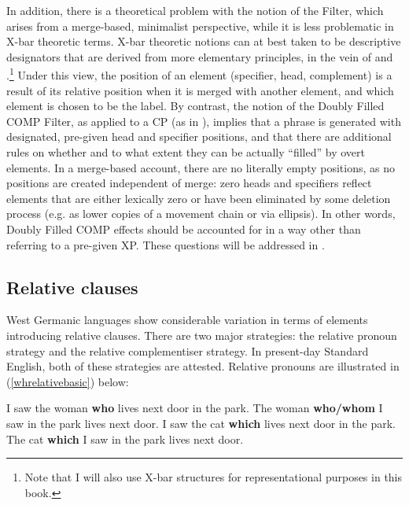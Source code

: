 In addition, there is a theoretical problem with the notion of the Filter, which arises from a merge-based, minimalist perspective, while it is less problematic in X-bar theoretic terms. X-bar theoretic notions can at best taken to be descriptive designators that are derived from more elementary principles, in the vein of \citet{kayne1994} and \citet{chomsky1995}.\footnote{Note that I will also use X-bar structures for representational purposes in this book.} Under this view, the position of an element (specifier, head, complement) is a result of its relative position when it is merged with another element, and which element is chosen to be the label. By contrast, the notion of the Doubly Filled COMP Filter, as applied to a CP (as in \citealt{baltin2010}), implies that a phrase is generated with designated, pre-given head and specifier positions, and that there are additional rules on whether and to what extent they can be actually ``filled'' by overt elements. In a merge-based account, there are no literally empty positions, as no positions are created independent of merge: zero heads and specifiers reflect elements that are either lexically zero or have been eliminated by some deletion process (e.g. as lower copies of a movement chain or via ellipsis). In other words, Doubly Filled COMP effects should be accounted for in a way other than referring to a pre-given XP. These questions will be addressed in .

\subsection{Relative clauses} \label{sec:1relative}
West Germanic languages show considerable variation in terms of elements introducing relative clauses. There are two major strategies: the relative pronoun strategy and the relative complementiser strategy. In present-day Standard English, both of these strategies are attested. Relative pronouns are illustrated in (\ref{whrelativebasic}) below:

\ea \label{whrelativebasic}
\ea I saw the woman \textbf{who} lives next door in the park. \label{whosubjectch1}
\ex The woman \textbf{who/whom} I saw in the park lives next door. \label{whoobjectch1}
\ex I saw the cat \textbf{which} lives next door in the park. \label{whichsubjectch1}
\ex The cat \textbf{which} I saw in the park lives next door. \label{whichobjectch1}
\z
\z

